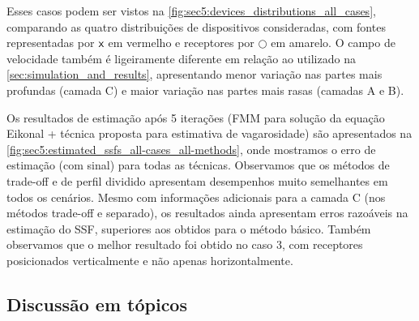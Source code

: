 Esses casos podem ser vistos na \cref{fig:sec5:devices_distributions_all_cases}, comparando as quatro distribuições de dispositivos consideradas, com fontes representadas por ${\textsf{x}}$ em vermelho e receptores por $\bigcirc$ em amarelo. O campo de velocidade também é ligeiramente diferente em relação ao utilizado na \cref{sec:simulation_and_results}, apresentando menor variação nas partes mais profundas (camada C) e maior variação nas partes mais rasas (camadas A e B).

Os resultados de estimação após 5 iterações (FMM para solução da equação Eikonal + técnica proposta para estimativa de vagarosidade) são apresentados na \cref{fig:sec5:estimated_ssfs_all-cases_all-methods}, onde mostramos o erro de estimação (com sinal) para todas as técnicas. Observamos que os métodos de trade-off e de perfil dividido apresentam desempenhos muito semelhantes em todos os cenários. Mesmo com informações adicionais para a camada C (nos métodos trade-off e separado), os resultados ainda apresentam erros razoáveis na estimação do SSF, superiores aos obtidos para o método básico. Também observamos que o melhor resultado foi obtido no caso 3, com receptores posicionados verticalmente e não apenas horizontalmente.





\cleardoublepage
\subsection{Discussão em tópicos}

